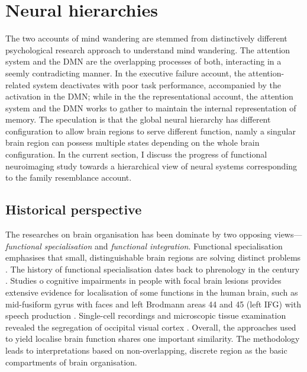 \section{Neural hierarchies}
\label{ch:intro:neural}

The two accounts of mind wandering are stemmed from distinctively different psychological research approach to understand mind wandering. The attention system and the DMN are the overlapping processes of both, interacting in a seemly contradicting manner. In the executive failure account, the attention-related system deactivates with poor task performance, accompanied by the activation in the DMN; while in the the representational account, the attention system and the DMN works to gather to maintain the internal representation of memory. The speculation is that the global neural hierarchy has different configuration to allow brain regions to serve different function, namly a singular brain region can possess multiple states depending on the whole brain configuration. In the current section, I discuss the progress of functional neuroimaging study towards a hierarchical view of neural systems corresponding to the family resemblance account.

\subsection{Historical perspective}

The researches on brain organisation has been dominate by two opposing views---\textit{functional specialisation} and \textit{functional integration}. Functional specialisation emphasises that small, distinguishable brain regions are solving distinct problems \cite{Kanwisher2010}. The history of functional specialisation dates back to phrenology in the  century \cite<for more history about functional localisation, see supporting information in >{Kanwisher2010}. Studies o cognitive impairments in people with focal brain lesions provides extensive evidence for localisation of some functions in the human brain, such as mid-fusiform gyrus with faces \cite{Iaria2008} and left Brodmann areas 44 and 45 (left IFG) with speech production \cite{Broca1861}. Single-cell recordings and microscopic tissue examination revealed the segregation of occipital visual cortex \cite{Zeki1978}. Overall, the approaches used to yield localise brain function shares one important similarity. The methodology leads to interpretations based on non-overlapping, discrete region as the basic compartments of brain organisation. 

